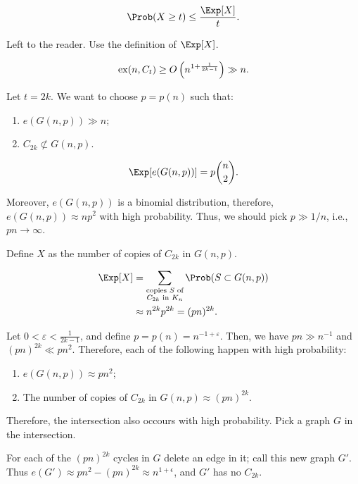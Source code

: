\begin{lem}\label{lem:markovinq}
	\[
		\Prob(X \ge t) \le \frac{\Exp[X]}{t}.
	\]
\end{lem}
\begin{dem}
	Left to the reader. Use the definition of $\Exp[X]$.
\end{dem}

\begin{thm}
	\[
		\operatorname{ex}(n, C_t) \ge O\left(n^{1+\frac{1}{2k-1}}\right) \gg n.
	\]
\end{thm}

\begin{dem}
	Let $t = 2k$. We want to choose $p = p(n)$ such that:
	\begin{enumerate}[label = \textbullet]
		\item $e(G(n, p)) \gg n$;
		\item $C_{2k} \not\subset G(n, p)$.
	\end{enumerate}

	\[
		\Exp[e(G(n, p))] = p\binom{n}{2}.
	\]

	Moreover, $e(G(n, p))$ is a binomial distribution, therefore, $e(G(n, p)) \approx np^2$ with high probability. Thus, we should pick $p \gg 1/n$, i.e., $pn \to \infty$. 

	Define $X$ as the number of copies of $C_{2k}$ in $G(n, p)$.

	\begin{align*}
		\Exp[X] &= \sum_{\substack{\text{copies $S$ of}\\C_{2k}\text{ in }K_n}} \Prob(S \subset G(n, p))\\
				&\approx n^{2k} p^{2k} = (pn)^{2k}.
	\end{align*}

	Let $0 < \varepsilon < \frac{1}{2k-1}$, and define $p = p(n) = n^{-1+\varepsilon}$. Then, we have $pn \gg n^{-1}$ and $(pn)^{2k} \ll pn^2$. Therefore, each of the following happen with high probability:
	\begin{enumerate}[label = \textbullet]
		\item $e(G(n, p)) \approx pn^2$;
		\item The number of copies of $C_{2k}$ in $G(n, p) \approx (pn)^{2k}$.
	\end{enumerate}

	Therefore, the intersection also occours with high probability. Pick a graph $G$ in the intersection.

	For each of the $(pn)^{2k}$ cycles in $G$ delete an edge in it; call this new graph $G'$. Thus $e(G') \approx pn^2 - (pn)^{2k} \approx n^{1+\epsilon} $, and $G'$ has no $C_{2k}$.
\end{dem}

